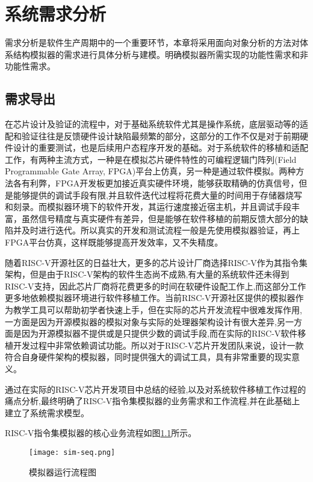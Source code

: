 
\chapter{系统需求分析}

需求分析是软件生产周期中的一个重要环节，本章将采用面向对象分析的方法对体系结构模拟器的需求进行具体分析与建模。明确模拟器所需实现的功能性需求和非功能性需求。

\section{需求导出}

在芯片设计及验证的流程中，对于基础系统软件尤其是操作系统，底层驱动等的适配和验证往往是反馈硬件设计缺陷最频繁的部分，这部分的工作不仅是对于前期硬件设计的重要测试，也是后续用户态程序开发的基础。对于系统软件的移植和适配工作，有两种主流方式，一种是在模拟芯片硬件特性的可编程逻辑门阵列(Field Programmable Gate Array, FPGA)平台上仿真，另一种是通过软件模拟。两种方法各有利弊，FPGA开发板更加接近真实硬件环境，能够获取精确的仿真信号，但是能够提供的调试手段有限,并且软件迭代过程将花费大量的时间用于存储器烧写和刻录。而模拟器环境下的软件开发，其运行速度接近宿主机，并且调试手段丰富，虽然信号精度与真实硬件有差异，但是能够在软件移植的前期反馈大部分的缺陷并及时进行迭代。所以真实的开发和测试流程一般是先使用模拟器验证，再上FPGA平台仿真，这样既能够提高开发效率，又不失精度。


随着RISC-V开源社区的日益壮大，更多的芯片设计厂商选择RISC-V作为其指令集架构，但是由于RISC-V架构的软件生态尚不成熟,有大量的系统软件还未得到RISC-V支持，因此芯片厂商将花费更多的时间在软硬件设配工作上,而这部分工作更多地依赖模拟器环境进行软件移植工作。当前RISC-V开源社区提供的模拟器作为教学工具可以帮助初学者快速上手，但在实际的芯片开发流程中很难发挥作用,一方面是因为开源模拟器的模拟对象与实际的处理器架构设计有很大差异,另一方面是因为开源模拟器不提供或是只提供少数的调试手段,而在实际的RISC-V软件移植开发过程中非常依赖调试功能。所以对于RISC-V芯片开发团队来说，设计一款符合自身硬件架构的模拟器，同时提供强大的调试工具，具有非常重要的现实意义。


通过在实际的RISC-V芯片开发项目中总结的经验,以及对系统软件移植工作过程的痛点分析,最终明确了RISC-V指令集模拟器的业务需求和工作流程,并在此基础上建立了系统需求模型。


RISC-V指令集模拟器的核心业务流程如图\ref{fig:sim-seq}所示。
\begin{figure}[H]
  \centering
  \texttt{[image: sim-seq.png]}
  \caption{模拟器运行流程图}
  \label{fig:sim-seq}
\end{figure}


